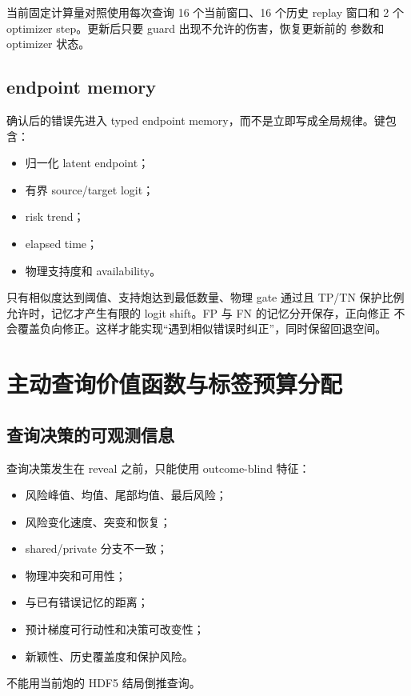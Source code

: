 \documentclass[11pt,a4paper]{article}
\begin{document}
当前固定计算量对照使用每次查询 16 个当前窗口、16 个历史 replay 窗口和
2 个 optimizer step。更新后只要 guard 出现不允许的伤害，恢复更新前的
参数和 optimizer 状态。

\subsection{endpoint memory}

确认后的错误先进入 typed endpoint memory，而不是立即写成全局规律。键包含：

\begin{itemize}
\item 归一化 latent endpoint；
\item 有界 source/target logit；
\item risk trend；
\item elapsed time；
\item 物理支持度和 availability。
\end{itemize}

只有相似度达到阈值、支持炮达到最低数量、物理 gate 通过且 TP/TN 保护比例
允许时，记忆才产生有限的 logit shift。FP 与 FN 的记忆分开保存，正向修正
不会覆盖负向修正。这样才能实现“遇到相似错误时纠正”，同时保留回退空间。

\section{主动查询价值函数与标签预算分配}

\subsection{查询决策的可观测信息}

查询决策发生在 reveal 之前，只能使用 outcome-blind 特征：

\begin{itemize}
\item 风险峰值、均值、尾部均值、最后风险；
\item 风险变化速度、突变和恢复；
\item shared/private 分支不一致；
\item 物理冲突和可用性；
\item 与已有错误记忆的距离；
\item 预计梯度可行动性和决策可改变性；
\item 新颖性、历史覆盖度和保护风险。
\end{itemize}

不能用当前炮的 HDF5 结局倒推查询。
\end{document}
